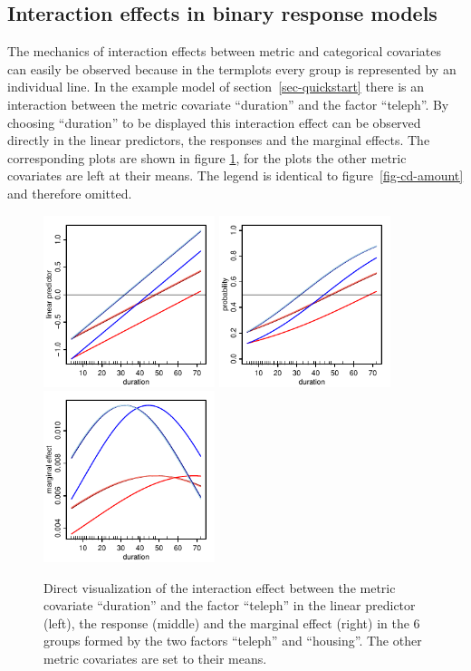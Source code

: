 \documentclass[nojss]{jss}
\newcommand{\quotes}[1]{``#1''}
\begin{document}
\subsection{Interaction effects in binary response models}
The mechanics of interaction effects between metric and categorical covariates can easily be observed because in the termplots  every group is represented by an individual line. In the example model of section~\ref{sec-quickstart} there is an interaction between the metric covariate \quotes{duration} and the factor \quotes{teleph}. By choosing \quotes{duration} to be displayed this interaction effect can be observed directly in the linear predictors, the responses and the marginal effects. The corresponding plots are shown in figure \ref{fig-cd-dur-1}, for the plots the other metric covariates are left at their means.  The legend is identical to figure~\ref{fig-cd-amount} and therefore omitted.
\begin{figure}[ht]
\centering
\includegraphics[width=5cm]{cd-dur-link-001} \includegraphics[width=5cm]{cd-dur-resp-001} \includegraphics[width=5cm]{cd-dur-marg-001}
\caption{Direct visualization of the interaction effect between the metric covariate \quotes{duration} and the factor \quotes{teleph} in the linear predictor (left), the response (middle) and the marginal effect (right) in the 6 groups formed by the two factors \quotes{teleph} and \quotes{housing}. The other metric covariates are set to their means.} \label{fig-cd-dur-1}
\end{figure}
\end{document}
